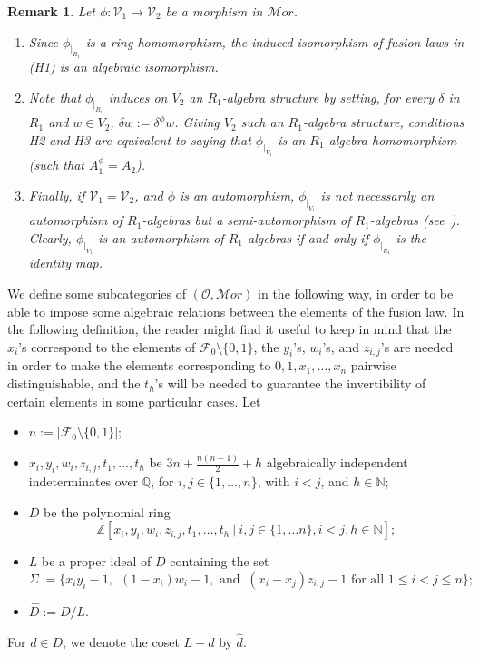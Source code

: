 \documentclass[a4paper]{amsart}
\newtheorem{remark}[lemma]{Remark}
\newcommand{\N}{{\mathbb N}}
\newcommand{\Q}{{\mathbb Q}}
\newcommand{\Z}{{\mathbb Z}}
\begin{document}
 \begin{remark}
 \label{labello}
Let $\phi \colon {\mathcal V_1}\to {\mathcal V_2}$ be a morphism in  $\mathcal Mor$.
\begin{enumerate}
\item Since $\phi_{|_{R_1}}$ is a ring homomorphism, the induced isomorphism of fusion laws  in (H1) is an algebraic isomorphism.
\item Note that $\phi_{|_{R_1}}$ induces on ${V_2}$  an $R_1$-algebra structure by setting, for every $\delta$ in $R_1$ and $w \in {V_2}$, $\delta w:=\delta^\phi w$. Giving ${V_2}$ such an $R_1$-algebra structure, conditions {\rm H2} and {\rm H3} are  equivalent to saying that $\phi_{|_{ V_1}}$ is an $R_1$-algebra homomorphism (such that  $A_{1}^\phi = A_2$).
\item Finally, if   ${\mathcal  V_1} = {\mathcal V_2}$, and $\phi$ is an automorphism, $\phi_{|_{V_1}}$ is not necessarily an  automorphism of $R_1$-algebras but a {\it semi-automorphism} of $R_1$-algebras (see~\cite{HRS}). Clearly,  $\phi_{|_{V_1}}$ is an automorphism of $R_1$-algebras if and only if $\phi_{|_{R_1}}$ is the identity map. 
\end{enumerate} 
\end{remark}
\medskip

We define some subcategories of $({\mathcal O},{\mathcal Mor})$ in the following way, in order to be able to impose some algebraic relations between the elements of the fusion law. In the following definition, the reader might find it useful to keep in mind that the $x_i$'s correspond to the elements of $\mathcal F_0\setminus \{0,1\}$, the $y_i$'s, $w_i$'s, and $z_{i,j}$'s are needed in order to make the elements corresponding to $0,1, x_1, \ldots , x_n$ pairwise distinguishable, and the $t_h$'s will be needed to guarantee the invertibility of certain elements in some particular cases. Let 
\begin{itemize}
\item[-] $n:=|\mathcal F_0\setminus \{0,1\}|$;
\item[-] $x_i, y_i, w_i, z_{i,j}, t_1, \ldots , t_h$ be $3n+\frac{n(n-1)}{2}+h$ algebraically independent indeterminates over $\Q$, for $i,j\in \{1, \ldots , n\}$, with $i<j$, and $h\in \N$; 
\item[-] $D$ be the polynomial ring 
$${\Z}[x_i, y_i, w_i, z_{i,j}, t_1, \ldots , t_h\:|\:i,j\in \{1, \ldots n\}, i<j, h\in \N];$$
\item[-] $L$ be a proper ideal of $D$ containing the set 
$$ \Sigma:=\{x_iy_{i}-1, \:\: (1-x_i)w_{i}-1, \mbox{ and } \:(x_i-x_j)z_{i,j}-1
 \mbox{ for all } 1\leq i<j\leq n \};$$  
\item [-] $\hat D:=D/L$.  
\end{itemize}
For $d\in D$, we denote the coset $L+d$ by $\hat d$. 
\end{document}
